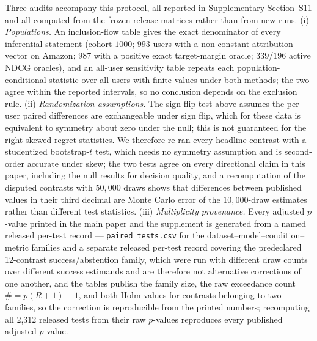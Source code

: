 \documentclass[manuscript,screen,review,anonymous]{acmart}
\begin{document}
Three audits accompany this protocol, all reported in Supplementary Section~S11 and all computed from the frozen release matrices rather than from new runs. (i) \emph{Populations.} An inclusion-flow table gives the exact denominator of every inferential statement (cohort $1000$; $993$ users with a non-constant attribution vector on Amazon; $987$ with a positive exact target-margin oracle; $339$/$196$ active NDCG oracles), and an all-user sensitivity table repeats each population-conditional statistic over all users with finite values under both methods; the two agree within the reported intervals, so no conclusion depends on the exclusion rule. (ii) \emph{Randomization assumptions.} The sign-flip test above assumes the per-user paired differences are exchangeable under sign flip, which for these data is equivalent to symmetry about zero under the null; this is not guaranteed for the right-skewed regret statistics. We therefore re-ran every headline contrast with a studentized bootstrap-$t$ test, which needs no symmetry assumption and is second-order accurate under skew; the two tests agree on every directional claim in this paper, including the null results for decision quality, and a recomputation of the disputed contrasts with $50{,}000$ draws shows that differences between published values in their third decimal are Monte Carlo error of the $10{,}000$-draw estimates rather than different test statistics. (iii) \emph{Multiplicity provenance.} Every adjusted $p$-value printed in the main paper and the supplement is generated from a named released per-test record --- \texttt{paired\_tests.csv} for the dataset--model--condition--metric families and a separate released per-test record covering the predeclared 12-contrast success/abstention family, which were run with different draw counts over different success estimands and are therefore not alternative corrections of one another, and the tables publish the family size, the raw exceedance count $\#=p(R+1)-1$, and both Holm values for contrasts belonging to two families, so the correction is reproducible from the printed numbers; recomputing all 2{,}312 released tests from their raw $p$-values reproduces every published adjusted $p$-value.
\end{document}

